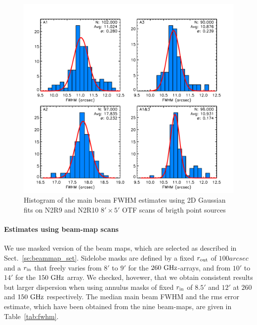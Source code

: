 \begin{figure}
\begin{center}
  \includegraphics[clip, angle=0, scale=0.7]{Figures/Main_Beam_FWHM_N2R9_10.pdf}
\caption[Main Beam FWHM distributions]{Histogram of the main beam FWHM estimates using 2D
  Gaussian fits on N2R9 and N2R10 $8' \times 5'$ OTF scans of brigth point sources}
\label{fig:fwhm_map}
\end{center}
\end{figure}

\paragraph{Estimates using beam-map scans}

We use masked version of the beam maps, which are selected as
described in Sect.~\ref{se:beammap_set}. 
Sidelobe masks are defined by a fixed $r_{\rm{out}}$ of $100 arcsec$
and a $r_{\rm{in}}$ that freely varies from $8'$ to $9'$ for the
$260~\rm{GHz}$-arrays, and from $10'$ to $14'$ for the $150~\rm{GHz}$
array. We checked, hovewer, that we obtain consistent results but
larger dispersion when using annulus masks of fixed $r_{\rm{in}}$ of
$8.5'$ and $12'$ at $260$ and $150~\rm{GHz}$ respectively. The median
main beam FWHM and the rms error estimate, which have been obtained
from the nine beam-maps, are given in Table~\ref{tab:fwhm}.

